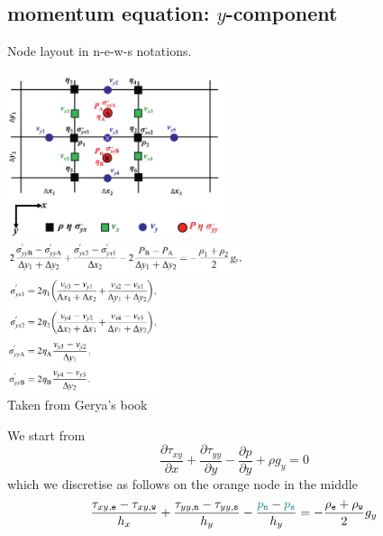 \newpage
\subsection{momentum equation: $y$-component}



\begin{multicols}{2}


{\captionfont Node layout in {n-e-w-s} notations.}

\columnbreak
\includegraphics[width=6.5cm]{images/fdm/gerya_C}\\
\includegraphics[width=7cm]{images/fdm/gerya_E}\\
\includegraphics[width=4.5cm]{images/fdm/gerya_G}\\
{\captionfont Taken from Gerya's book}
\end{multicols}


We start from 
\[
\frac{\partial \tau_{xy}}{\partial x}  + 
\frac{\partial \tau_{yy}}{\partial y}  
- \frac{\partial p}{\partial y} + \rho g_y = 0
\]
which we discretise as follows on the orange node in the middle
\[
\frac{\tau_{xy,{\tt e}}-\tau_{xy,{\tt w}}}{h_x} + \frac{\tau_{yy,{\tt n}}-\tau_{yy,{\tt s}}}{h_y} 
-\frac{{\color{teal}p_{\tt n}}-{\color{teal}p_{\tt s}}}{h_y} 
= -\frac{\rho_{\tt e}+\rho_{\tt w}}{2} g_y
\]

